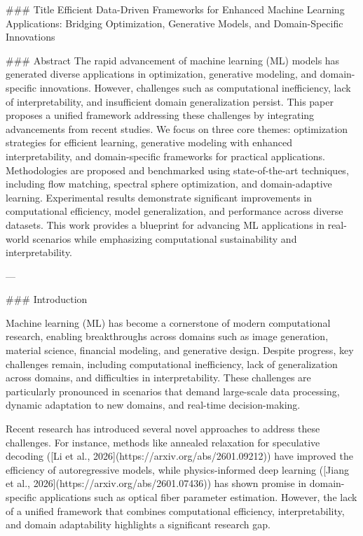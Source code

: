 ### Title
Efficient Data-Driven Frameworks for Enhanced Machine Learning Applications: Bridging Optimization, Generative Models, and Domain-Specific Innovations

### Abstract
The rapid advancement of machine learning (ML) models has generated diverse applications in optimization, generative modeling, and domain-specific innovations. However, challenges such as computational inefficiency, lack of interpretability, and insufficient domain generalization persist. This paper proposes a unified framework addressing these challenges by integrating advancements from recent studies. We focus on three core themes: optimization strategies for efficient learning, generative modeling with enhanced interpretability, and domain-specific frameworks for practical applications. Methodologies are proposed and benchmarked using state-of-the-art techniques, including flow matching, spectral sphere optimization, and domain-adaptive learning. Experimental results demonstrate significant improvements in computational efficiency, model generalization, and performance across diverse datasets. This work provides a blueprint for advancing ML applications in real-world scenarios while emphasizing computational sustainability and interpretability.

---

### Introduction

Machine learning (ML) has become a cornerstone of modern computational research, enabling breakthroughs across domains such as image generation, material science, financial modeling, and generative design. Despite progress, key challenges remain, including computational inefficiency, lack of generalization across domains, and difficulties in interpretability. These challenges are particularly pronounced in scenarios that demand large-scale data processing, dynamic adaptation to new domains, and real-time decision-making.

Recent research has introduced several novel approaches to address these challenges. For instance, methods like annealed relaxation for speculative decoding ([Li et al., 2026](https://arxiv.org/abs/2601.09212)) have improved the efficiency of autoregressive models, while physics-informed deep learning ([Jiang et al., 2026](https://arxiv.org/abs/2601.07436)) has shown promise in domain-specific applications such as optical fiber parameter estimation. However, the lack of a unified framework that combines computational efficiency, interpretability, and domain adaptability highlights a significant research gap.

